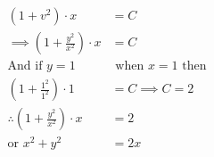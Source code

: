 \documentclass[14pt,fleqn]{extarticle}
\begin{document}
\begin{problem}
\begin{step}
\begin{align}
(1+v^2)\cdot x &= C \\
\implies \left( 1 + \frac{y^2}{x^2}\right)\cdot x &= C\\
\text{And if }y = 1& \text{ when }x = 1 \text{ then}  \\
\left( 1 + \frac{1^2}{1^2}\right)\cdot 1 &= C \implies C = 2 \\
\therefore \left( 1 + \frac{y^2}{x^2}\right)\cdot x &= 2 \\[10pt]
\text{or }x^2 + y^2 &= 2x 
\end{align} 
\end{step}
\end{problem}
\end{document}
